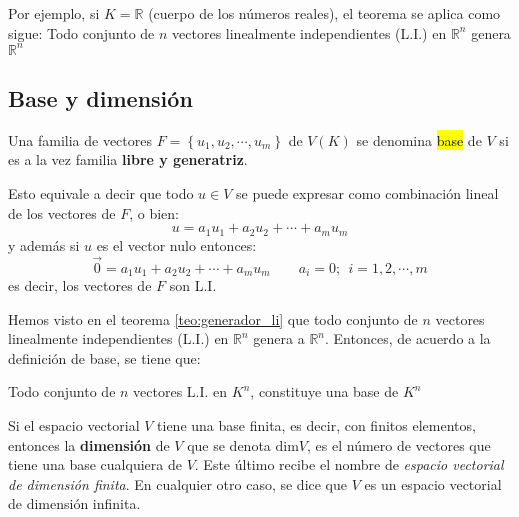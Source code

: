 Por ejemplo, si \(K=\mathbb{R}\) (cuerpo de los números reales), el teorema se aplica como sigue: Todo conjunto de \(n\) vectores linealmente independientes (L.I.) en \(\mathbb{R}^n\) genera \(\mathbb{R}^n\)

\subsection{Base y dimensión}

Una familia de vectores \(F = \left\{u_1, u_2, \cdots, u_m\right\}\) de \(V(K)\) se denomina \hl{base} de \(V\) si es a la vez familia \textbf{libre y generatriz}.

Esto equivale a decir que todo \(u \in V\) se puede expresar como combinación lineal de los vectores de \(F\), o bien:
\[
  u = a_1 u_1 + a_2 u _2 + \cdots + a_m u_m
\] 
y además si \(u\) es el vector nulo entonces:
\[
  \vec{0} = a_1 u_1 + a_2 u_2 + \cdots + a_m u_m \qquad a_i = 0; ~~ i=1,2,\cdots,m
\]
es decir, los vectores de \(F\) son L.I.

Hemos visto en el teorema \ref{teo:generador_li} que todo conjunto de \(n\) vectores linealmente independientes (L.I.) en \(\mathbb{R}^n\) genera a \(\mathbb{R}^n\). Entonces, de acuerdo a la definición de base, se tiene que:
\begin{tcolorbox}
  \centering
  Todo conjunto de \(n\) vectores L.I. en \(K^n\), constituye una base de \(K^n\)
\end{tcolorbox}

Si el espacio vectorial \(V\) tiene una base finita, es decir, con finitos elementos, entonces la \textbf{dimensión} de \(V\) que se denota \(\text{dim}V\), es el número de vectores que tiene una base cualquiera de \(V\). Este último recibe el nombre de \textit{espacio vectorial de dimensión finita}. En cualquier otro caso, se dice que \(V\) es un espacio vectorial de dimensión infinita.

